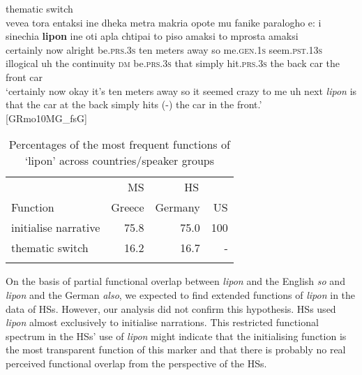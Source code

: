 \documentclass[output=paper,colorlinks,citecolor=brown]{langscibook}
\begin{document}
\ea thematic switch\label{ex:labrenzetal:23}\\
\gll vevea tora entaksi ine dheka metra makria opote mu fanike paralogho e: i sinechia \textbf{lipon} ine oti apla chtipai to piso amaksi to mprosta amaksi \\ certainly now alright be.\textsc{prs.3s} ten meters away so me.\textsc{gen.1s} seem.\textsc{pst.13s} illogical uh the continuity \textsc{dm} be.\textsc{prs.3s} that simply hit.\textsc{prs.3s} the back car the front car\\
\glt ‘certainly now okay it’s ten meters away so it seemed crazy to me uh next \textit{lipon} is that the car at the back simply hits (-) the car in the front.’ \\
\hfill[GRmo10MG\_fsG]
\z

\begin{table}
\caption{Percentages of the most frequent functions of ‘lipon’ across countries\slash speaker groups}
\label{tab:labrenzetal:7}
 \centering
 \begin{tabular}{ l rrr }
  \lsptoprule
    & MS & \multicolumn{2}{c}{HS}  \\\cmidrule(lr){2-2} \cmidrule(lr){3-4}
  Function  &   Greece  &    Germany  &    US  \\
  \midrule
  initialise narrative  &   75.8  &    75.0  &    100  \\
  thematic switch  &   16.2 &   16.7  &   - \\
  \lspbottomrule
 \end{tabular}
\end{table}

\noindent On the basis of partial functional overlap between \textit{lipon} and the English \textit{so} and \textit{lipon} and the German \textit{also}, we expected to find extended functions of \textit{lipon} in the data of HSs. However, our analysis did not confirm this hypothesis. HSs used \textit{lipon} almost exclusively to initialise narrations. This restricted functional spectrum in the HSs’ use of \textit{lipon} might indicate that the initialising function is the most transparent function of this marker and that there is probably no real perceived functional overlap from the perspective of the HSs.
\end{document}
